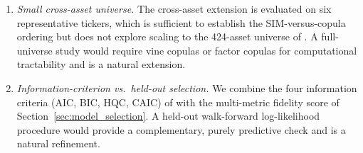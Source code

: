 \begin{enumerate}
    \item \textit{Small cross-asset universe.}
    The cross-asset extension is evaluated on six representative tickers, which is sufficient to establish the SIM-versus-copula ordering but does not explore scaling to the 424-asset universe of \citet{alswaidan2026hybrid}.
    A full-universe study would require vine copulas or factor copulas for computational tractability and is a natural extension.

    \item \textit{Information-criterion vs.\ held-out selection.}
    We combine the four information criteria (AIC, BIC, HQC, CAIC) of \citet{nguyen2018hidden} with the multi-metric fidelity score of Section~\ref{sec:model_selection}.
    A held-out walk-forward log-likelihood procedure would provide a complementary, purely predictive check and is a natural refinement.
\end{enumerate}

